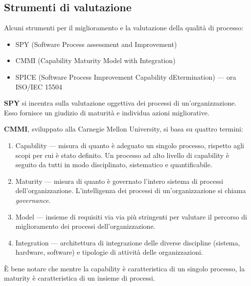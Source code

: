 \documentclass[a4paper]{article}
\begin{document}
		
	\subsection{Strumenti di valutazione}

		
Alcuni strumenti per il miglioramento e la valutazione della qualità di processo:
		
	\begin{itemize}
		
			
	\item SPY (Software Process assessment and Improvement)
			
	\item CMMI (Capability Maturity Model with Integration)
			
	\item SPICE (Software Process Improvement Capability dEtermination) --- ora ISO/IEC 15504
		
	\end{itemize}

		
\textbf{SPY} si incentra sulla valutazione oggettiva dei processi di un'organizzazione. Esso fornisce un giudizio di maturità e individua azioni migliorative.
		
\textbf{CMMI}, sviluppato alla Carnegie Mellon University, si basa su quattro termini:
		
	\begin{enumerate}
		
			
	\item Capability --- misura di quanto è adeguato un singolo processo, rispetto agli scopi per cui è stato definito. Un processo ad alto livello di capability è seguito da tutti in modo disciplinato, sistematico e quantificabile.
			
	\item Maturity --- misura di quanto è governato l'intero sistema di processi dell'organizzazione. L'intelligenza dei processi di un'organizzazione si chiama \emph{governance}.
			
	\item Model --- insieme di requisiti via via più stringenti per valutare il percorso di miglioramento dei processi dell'organizzazione.
			
	\item Integration --- architettura di integrazione delle diverse discipline (sistema, hardware, software) e tipologie di attività delle organizzazioni.
		
	\end{enumerate}

		
È bene notare che mentre la capability è caratteristica di un singolo processo, la maturity è caratteristica di un insieme di processi.
		
\end{document}
